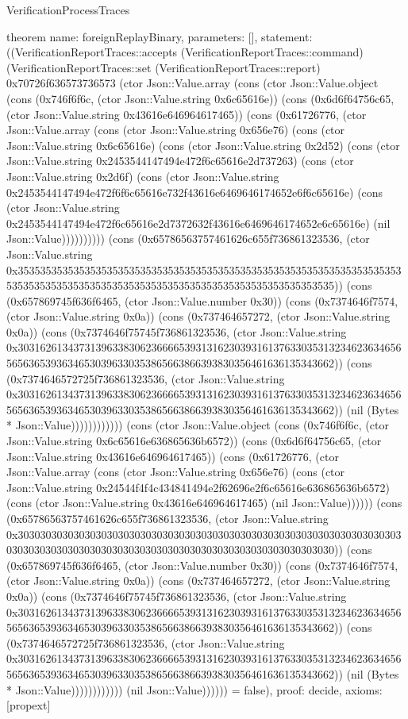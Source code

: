 \begin{lexlean}{VerificationProcessTraces}
\begin{semanticmodule}
theorem{
  name: foreignReplayBinary,
  parameters: [],
  statement: ((VerificationReportTraces::accepts (VerificationReportTraces::command) (VerificationReportTraces::set (VerificationReportTraces::report) 0x70726f636573736573 (ctor Json::Value.array (cons (ctor Json::Value.object (cons (0x746f6f6c, (ctor Json::Value.string 0x6c65616e)) (cons (0x6d6f64756c65, (ctor Json::Value.string 0x43616e646964617465)) (cons (0x61726776, (ctor Json::Value.array (cons (ctor Json::Value.string 0x656e76) (cons (ctor Json::Value.string 0x6c65616e) (cons (ctor Json::Value.string 0x2d52) (cons (ctor Json::Value.string 0x2453544147494e472f6c65616e2d737263) (cons (ctor Json::Value.string 0x2d6f) (cons (ctor Json::Value.string 0x2453544147494e472f6f6c65616e732f43616e6469646174652e6f6c65616e) (cons (ctor Json::Value.string 0x2453544147494e472f6c65616e2d7372632f43616e6469646174652e6c65616e) (nil Json::Value)))))))))) (cons (0x65786563757461626c655f736861323536, (ctor Json::Value.string 0x35353535353535353535353535353535353535353535353535353535353535353535353535353535353535353535353535353535353535353535353535353535)) (cons (0x657869745f636f6465, (ctor Json::Value.number 0x30)) (cons (0x7374646f7574, (ctor Json::Value.string 0x0a)) (cons (0x737464657272, (ctor Json::Value.string 0x0a)) (cons (0x7374646f75745f736861323536, (ctor Json::Value.string 0x30316261343731396338306236666539313162303931613763303531323462363465656563653936346530396330353865663866393830356461636135343662)) (cons (0x7374646572725f736861323536, (ctor Json::Value.string 0x30316261343731396338306236666539313162303931613763303531323462363465656563653936346530396330353865663866393830356461636135343662)) (nil (Bytes * Json::Value)))))))))))) (cons (ctor Json::Value.object (cons (0x746f6f6c, (ctor Json::Value.string 0x6c65616e636865636b6572)) (cons (0x6d6f64756c65, (ctor Json::Value.string 0x43616e646964617465)) (cons (0x61726776, (ctor Json::Value.array (cons (ctor Json::Value.string 0x656e76) (cons (ctor Json::Value.string 0x24544f4f4c434841494e2f62696e2f6c65616e636865636b6572) (cons (ctor Json::Value.string 0x43616e646964617465) (nil Json::Value)))))) (cons (0x65786563757461626c655f736861323536, (ctor Json::Value.string 0x30303030303030303030303030303030303030303030303030303030303030303030303030303030303030303030303030303030303030303030303030303030)) (cons (0x657869745f636f6465, (ctor Json::Value.number 0x30)) (cons (0x7374646f7574, (ctor Json::Value.string 0x0a)) (cons (0x737464657272, (ctor Json::Value.string 0x0a)) (cons (0x7374646f75745f736861323536, (ctor Json::Value.string 0x30316261343731396338306236666539313162303931613763303531323462363465656563653936346530396330353865663866393830356461636135343662)) (cons (0x7374646572725f736861323536, (ctor Json::Value.string 0x30316261343731396338306236666539313162303931613763303531323462363465656563653936346530396330353865663866393830356461636135343662)) (nil (Bytes * Json::Value)))))))))))) (nil Json::Value)))))) = false),
  proof: decide{},
  axioms: [propext]
}









\end{semanticmodule}
\end{lexlean}
